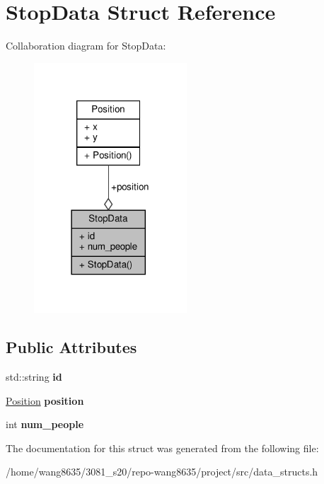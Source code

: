\hypertarget{structStopData}{}\section{Stop\+Data Struct Reference}
\label{structStopData}


Collaboration diagram for Stop\+Data\+:\nopagebreak
\begin{figure}[H]
\begin{center}
\leavevmode
\includegraphics[width=162pt]{structStopData__coll__graph}
\end{center}
\end{figure}
\subsection*{Public Attributes}
\begin{DoxyCompactItemize}
\item 
\mbox{\label{structStopData_abf63e623637d887c203c2a02b0855bb4}} 
std\+::string {\bfseries id}
\item 
\mbox{\label{structStopData_ae2e45d96bcd5b5f262796a6200a14fda}} 
\hyperlink{structPosition}{Position} {\bfseries position}
\item 
\mbox{\label{structStopData_ac8346b0259972f304061a205d3f75f80}} 
int {\bfseries num\+\_\+people}
\end{DoxyCompactItemize}


The documentation for this struct was generated from the following file\+:\begin{DoxyCompactItemize}
\item 
/home/wang8635/3081\+\_\+s20/repo-\/wang8635/project/src/data\+\_\+structs.\+h\end{DoxyCompactItemize}
